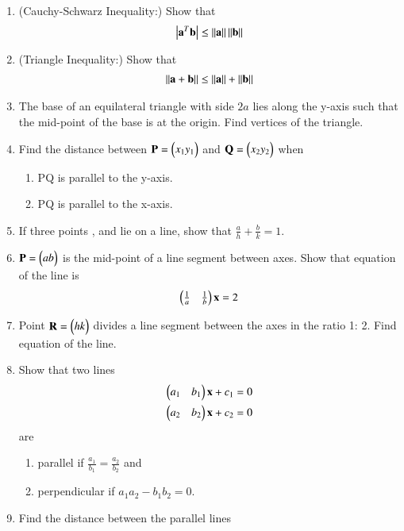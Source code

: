 \begin{enumerate}[label=\arabic*.,ref=\thesubsection.\theenumi]
\item (Cauchy-Schwarz Inequality:) Show that 
%
\begin{align}
\left\vert\mathbf{a}^T\mathbf{b}\right\vert \le \left\lVert\mathbf{a}\right\rVert\left\lVert\mathbf{b}\right\rVert
\end{align}
%
\solution 

%
\item (Triangle Inequality:) Show that 
%
\begin{align}
\left\lVert\mathbf{a}+\mathbf{b}\right\rVert \le \left\lVert\mathbf{a}\right\rVert+\left\lVert\mathbf{b}\right\rVert
\end{align}
%
\solution 

%
\item The base of an equilateral triangle with side $2a$ lies along the y-axis such that the mid-point of the base is at the origin. Find vertices of the triangle.
\solution 

\item Find the distance between $\mathbf{P}= \begin{pmatrix}x_1 y_1\end{pmatrix}$ and $\mathbf{Q} =\begin{pmatrix}x_2 y_2\end{pmatrix}$ when
\begin{enumerate}
\item PQ is parallel to the y-axis.
\item PQ is parallel to the x-axis.
\end{enumerate}
\item If three points ,  and  lie on a line, show that
$\frac{a}{h}+\frac{b}{k}= 1$.
\item $\mathbf{P}=\begin{pmatrix}a b\end{pmatrix}$ is the mid-point of a line segment between axes. Show that equation of the line is
\begin{align}
\begin{pmatrix}\frac{1}{a} & \frac{1}{b}\end{pmatrix}\mathbf{x} = 2
\end{align}
\item  Point $\mathbf{R}= \begin{pmatrix}h k\end{pmatrix}$ divides a line segment between the axes in the ratio 1: 2. Find equation of the line.
\item Show that two lines 
\begin{align}
\begin{pmatrix}a_1 & b_1\end{pmatrix}\mathbf{x} +c_1&= 0
\\
\begin{pmatrix}a_2 & b_2\end{pmatrix}\mathbf{x} +c_2&= 0
\end{align}
are 
\begin{enumerate}
\item parallel if $\frac{a_1}{b_1}=\frac{a_2}{b_2}$ and
\item perpendicular if $a_1a_2-b_1b_2 = 0$.
\end{enumerate}
%
\item Find the distance between the parallel lines

\end{enumerate}
